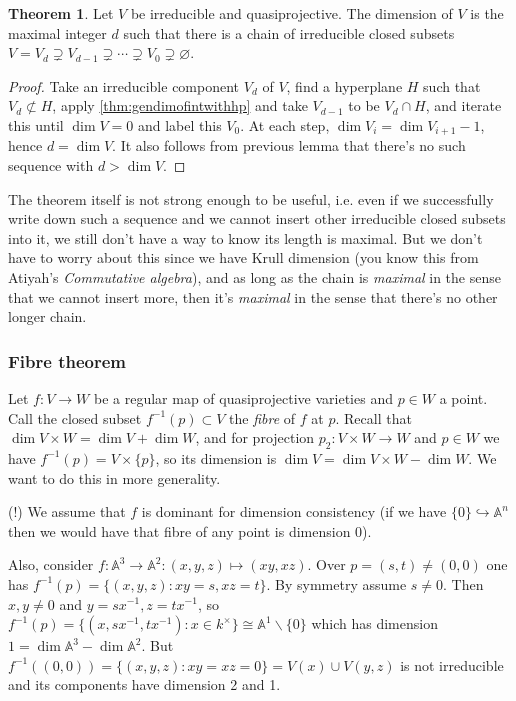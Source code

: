 \documentclass{article}
\newcommand{\A}{\mathbb{A}}
\theoremstyle{definition}
\newtheorem{thm}[defn]{Theorem}
\begin{document}
\begin{thm}
Let $V$ be irreducible and quasiprojective. The dimension of $V$ is the maximal integer $d$ such that there is a chain of irreducible closed subsets $V=V_d\supsetneq V_{d-1}\supsetneq\cdots\supsetneq V_0\supsetneq\varnothing$.
\end{thm}
\begin{proof}
Take an irreducible component $V_d$ of $V$, find a hyperplane $H$ such that $V_d\not\subset H$, apply \ref{thm:gendimofintwithhp} and take $V_{d-1}$ to be $V_d\cap H$, and iterate this until $\dim V=0$ and label this $V_0$. At each step, $\dim V_i=\dim V_{i+1}-1$, hence $d=\dim V$. It also follows from previous lemma that there's no such sequence with $d>\dim V$.
\end{proof}

The theorem itself is not strong enough to be useful, i.e. even if we successfully write down such a sequence and we cannot insert other irreducible closed subsets into it, we still don't have a way to know its length is maximal. But we don't have to worry about this since we have Krull dimension (you know this from Atiyah's \textit{Commutative algebra}), and as long as the chain is \textit{maximal} in the sense that we cannot insert more, then it's \textit{maximal} in the sense that there's no other longer chain.

\subsubsection{Fibre theorem}
Let $f:V\rightarrow W$ be a regular map of quasiprojective varieties and $p\in W$ a point. Call the closed subset $f^{-1}(p)\subset V$ the \textit{fibre} of $f$ at $p$. Recall that $\dim V\times W=\dim V+\dim W$, and for projection $p_2:V\times W\rightarrow W$ and $p\in W$ we have $f^{-1}(p)=V\times \{p\}$, so its dimension is $\dim V=\dim V\times W-\dim W$. We want to do this in more generality.

(!) We assume that $f$ is dominant for dimension consistency (if we have $\{0\}\hookrightarrow\A^n$ then we would have that fibre of any point is dimension 0).

Also, consider $f:\A^3\rightarrow\A^2:(x,y,z)\mapsto(xy,xz)$. Over $p=(s,t)\neq (0,0)$ one has $f^{-1}(p)=\{(x,y,z):xy=s,xz=t\}$. By symmetry assume $s\neq 0$. Then $x,y\neq 0$ and $y=sx^{-1},z=tx^{-1}$, so $f^{-1}(p)=\{(x,sx^{-1},tx^{-1}):x\in k^\times\}\cong\A^1\backslash\{0\}$ which has dimension $1=\dim\A^3-\dim\A^2$. But $f^{-1}((0,0))=\{(x,y,z):xy=xz=0\}=V(x)\cup V(y,z)$ is not irreducible and its components have dimension 2 and 1.
\end{document}
